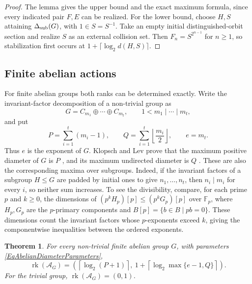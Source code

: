 \documentclass[12pt,english]{amsart}
\newtheorem{theorem}{Theorem}[section]
\theoremstyle{definition}
\numberwithin{equation}{section}
\theoremstyle{remark}
\begin{document}
\begin{proof}
The lemma gives the upper bound and the exact maximum formula,
since every indicated pair $F,E$ can be realized. For the lower
bound, choose $H,S$ attaining $\Delta_{\rm sub}(G)$, with
$1\in S=S^{-1}$. Take an empty initial distinguished-orbit section
and realize $S$ as an external collision set. Then
$F_n=S^{2^{n-1}}$ for $n\geqslant1$, so stabilization first occurs
at $1+\lceil\log_2 d(H,S)\rceil$.
\end{proof}

\subsection{Finite abelian actions}\label{SubsecAbelianActions}

For finite abelian groups both ranks can be determined exactly.
Write the invariant-factor decomposition of a non-trivial group as
\[
G=C_{m_1}\oplus\cdots\oplus C_{m_t},\qquad
1<m_1\mid\cdots\mid m_t,
\]
and put
\begin{equation}\label{EqAbelianDiameterParameters}
P=\sum_{i=1}^t(m_i-1),\qquad
Q=\sum_{i=1}^t\left\lfloor\frac{m_i}{2}\right\rfloor,\qquad
e=m_t.
\end{equation}
Thus $e$ is the exponent of $G$. Klopsch and Lev prove that the
maximum positive diameter of $G$ is $P$
\cite[Theorem~2.1]{KL09}, and its maximum undirected diameter is
$Q$ \cite[Theorem~2.1]{KL03}. These are also the corresponding
maxima over subgroups. Indeed, if the invariant factors of a
subgroup $H\leqslant G$ are padded by initial ones to give $n_1,\ldots,n_t$, then
$n_i\mid m_i$ for every $i$, so neither sum increases. To see the
divisibility, compare, for each prime $p$ and $k\geqslant0$, the
dimensions of $(p^kH_p)[p]\leqslant(p^kG_p)[p]$ over $\mathbb F_p$,
where $H_p,G_p$ are the $p$-primary components and
$B[p]=\{b\in B\mid pb=0\}$. These dimensions count the invariant
factors whose $p$-exponents exceed $k$, giving the componentwise
inequalities between the ordered exponents.

\begin{theorem}\label{ThmAbelianActionRanks}
For every non-trivial finite abelian group $G$, with parameters
\eqref{EqAbelianDiameterParameters},
\begin{equation}\label{EqAbelianActionRanks}
\operatorname{rk}(\mathcal A_G)
=
\left(
\left\lceil\log_2(P+1)\right\rceil,\
1+\left\lceil\log_2\max\{e-1,Q\}\right\rceil
\right).
\end{equation}
For the trivial group, $\operatorname{rk}(\mathcal A_G)=(0,1)$.
\end{theorem}
\end{document}
